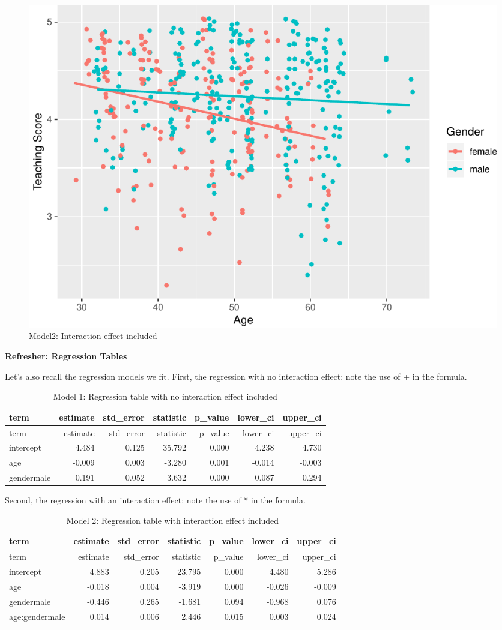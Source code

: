 \documentclass[]{article}
\begin{document}
\begin{figure}

{\centering \includegraphics[width=0.85\linewidth]{DAWeek8_files/figure-latex/plot2-1} 

}

\caption{\label{fig:plot2}Model2: Interaction effect included}\label{fig:plot2}
\end{figure}

\newpage  

\textbf{Refresher: Regression Tables}

Let's also recall the regression models we fit. First, the regression
with no interaction effect: note the use of + in the formula.

\begin{longtable}[]{@{}lrrrrrr@{}}
\caption{Model 1: Regression table with no interaction effect
included}\tabularnewline
\toprule
term & estimate & std\_error & statistic & p\_value & lower\_ci &
upper\_ci\tabularnewline
\midrule
\endfirsthead
\toprule
term & estimate & std\_error & statistic & p\_value & lower\_ci &
upper\_ci\tabularnewline
\midrule
\endhead
intercept & 4.484 & 0.125 & 35.792 & 0.000 & 4.238 &
4.730\tabularnewline
age & -0.009 & 0.003 & -3.280 & 0.001 & -0.014 & -0.003\tabularnewline
gendermale & 0.191 & 0.052 & 3.632 & 0.000 & 0.087 &
0.294\tabularnewline
\bottomrule
\end{longtable}

Second, the regression with an interaction effect: note the use of * in
the formula.

\begin{longtable}[]{@{}lrrrrrr@{}}
\caption{Model 2: Regression table with interaction effect
included}\tabularnewline
\toprule
term & estimate & std\_error & statistic & p\_value & lower\_ci &
upper\_ci\tabularnewline
\midrule
\endfirsthead
\toprule
term & estimate & std\_error & statistic & p\_value & lower\_ci &
upper\_ci\tabularnewline
\midrule
\endhead
intercept & 4.883 & 0.205 & 23.795 & 0.000 & 4.480 &
5.286\tabularnewline
age & -0.018 & 0.004 & -3.919 & 0.000 & -0.026 & -0.009\tabularnewline
gendermale & -0.446 & 0.265 & -1.681 & 0.094 & -0.968 &
0.076\tabularnewline
age:gendermale & 0.014 & 0.006 & 2.446 & 0.015 & 0.003 &
0.024\tabularnewline
\bottomrule
\end{longtable}
\end{document}
